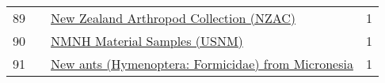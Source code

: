 \begin{longtable}{llp{5in}r}
89 &    &                                                                                                                                                          \href{https://www.gbif.org/dataset/6e4b215e-9019-4934-8433-65d80a35c230}{New Zealand Arthropod Collection (NZAC)} &             1 \\
90 &    &                                                                                                                                                                     \href{https://www.gbif.org/dataset/26098c25-8f7f-4c71-97ac-1d3db181c65e}{NMNH Material Samples (USNM)} &             1 \\
91 &    &                                                                                                                                               \href{https://www.gbif.org/dataset/daea9e8b-0c17-46ba-8d74-9990b408f14a}{New ants (Hymenoptera: Formicidae) from Micronesia} &             1 \\
\end{longtable}

